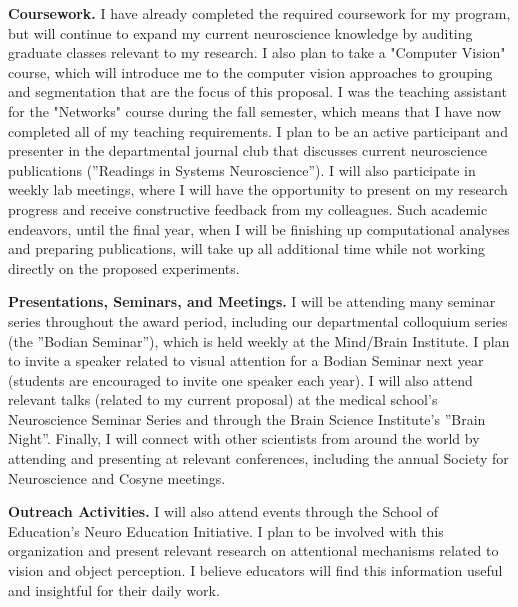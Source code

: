 \documentclass[11pt,notitlepage]{article}
\begin{document}
\textbf{Coursework.} I have already completed the required coursework for my program, but will continue to expand my current neuroscience knowledge by auditing graduate classes relevant to my research. I also plan to take a "Computer Vision" course, which will introduce me to the computer vision approaches to grouping and segmentation that are the focus of this proposal. I was the teaching assistant for the "Networks" course during the fall semester, which means that I have now completed all of my teaching requirements. I plan to be an active participant and presenter in the departmental journal club that discusses current neuroscience publications (''Readings in Systems Neuroscience''). I will also participate in weekly lab meetings, where I will have the opportunity to present on my research progress and receive constructive feedback from my colleagues. Such academic endeavors, until the final year, when I will be finishing up computational analyses and preparing publications, will take up all additional time while not working directly on the proposed experiments.

\textbf{Presentations, Seminars, and Meetings.} I will be attending many seminar series throughout the award period, including our departmental colloquium series (the ''Bodian Seminar''), which is held weekly at the Mind/Brain Institute. I plan to invite a speaker related to visual attention for a Bodian Seminar next year (students are encouraged to invite one speaker each year). I will also attend relevant talks (related to my current proposal) at the medical school's Neuroscience Seminar Series and through the Brain Science Institute's ''Brain Night''. Finally, I will connect with other scientists from around the world by attending and presenting at relevant conferences, including the annual Society for Neuroscience and Cosyne meetings.

\textbf{Outreach Activities.} I will also attend events through the School of Education's Neuro Education Initiative. I plan to be involved with this organization and present relevant research on attentional mechanisms related to vision and object perception. I believe educators will find this information useful and insightful for their daily work.

\clearpage
\end{document}
